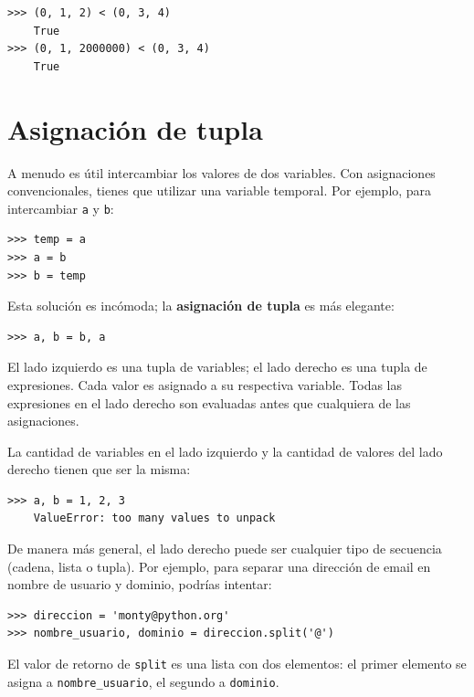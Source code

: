 \documentclass[10pt]{book}
\begin{document}
\begin{verbatim}
>>> (0, 1, 2) < (0, 3, 4)
    True
>>> (0, 1, 2000000) < (0, 3, 4)
    True
\end{verbatim}



\section{Asignación de tupla}
\label{tuple.assignment}

A menudo es útil intercambiar los valores de dos variables.
Con asignaciones convencionales, tienes que utilizar una variable
temporal.  Por ejemplo, para intercambiar {\tt a} y {\tt b}:

\begin{verbatim}
>>> temp = a
>>> a = b
>>> b = temp
\end{verbatim}
%
Esta solución es incómoda; la {\bf asignación de tupla} es más elegante:

\begin{verbatim}
>>> a, b = b, a
\end{verbatim}
%
El lado izquierdo es una tupla de variables; el lado derecho es una tupla de
expresiones.  Cada valor es asignado a su respectiva variable.
Todas las expresiones en el lado derecho son evaluadas antes que cualquiera
de las asignaciones.

La cantidad de variables en el lado izquierdo y la cantidad de valores del
lado derecho tienen que ser la misma:

\begin{verbatim}
>>> a, b = 1, 2, 3
    ValueError: too many values to unpack
\end{verbatim}
%
De manera más general, el lado derecho puede ser cualquier tipo de secuencia
(cadena, lista o tupla).  Por ejemplo, para separar una dirección de email
en nombre de usuario y dominio, podrías intentar:

\begin{verbatim}
>>> direccion = 'monty@python.org'
>>> nombre_usuario, dominio = direccion.split('@')
\end{verbatim}
%
El valor de retorno de {\tt split} es una lista con dos elementos:
el primer elemento se asigna a {\tt nombre\_usuario}, el segundo a
{\tt dominio}.
\end{document}
